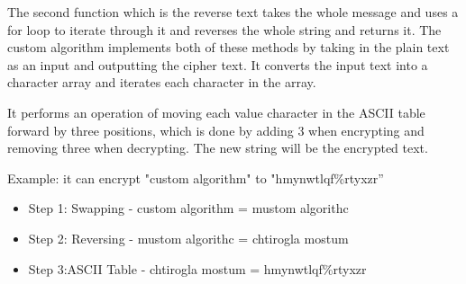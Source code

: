 The second function which is the reverse text takes the whole message and uses a for loop to iterate through it and reverses the whole string and returns it. 
The custom algorithm implements both of these methods by taking in the plain text as an input and outputting the cipher text. It converts the input text into a character array and iterates each character in the array.

It performs an operation of moving each value character in the ASCII table forward by three positions, which is done by adding 3 when encrypting and removing three when decrypting.  The new string will be the encrypted text.

Example: it can encrypt "custom algorithm" to "hmynwtlqf\%rtyxzr”

\begin{itemize}
    \item Step 1: Swapping - custom algorithm = mustom algorithc
    \item Step 2: Reversing  - mustom algorithc = chtirogla mostum
    \item Step 3:ASCII Table - chtirogla mostum = hmynwtlqf\%rtyxzr\\
\end{itemize}


